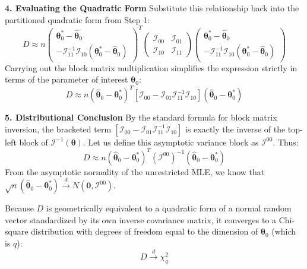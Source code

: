 \documentclass[
  letterpaper,
  DIV=11,
  numbers=noendperiod]{scrreprt}
\renewcommand{\[}{\begin{equation}}
\renewcommand{\]}{\end{equation}}
\theoremstyle{definition}
\theoremstyle{plain}
\theoremstyle{plain}
\theoremstyle{plain}
\theoremstyle{definition}
\theoremstyle{plain}
\theoremstyle{remark}
\begin{document}
\textbf{4. Evaluating the Quadratic Form} Substitute this relationship
back into the partitioned quadratic form from Step 1:
\[D \approx n \begin{pmatrix} \boldsymbol{\theta}_0^* - \hat{\boldsymbol{\theta}}_0 \\ -\mathcal{I}_{11}^{-1} \mathcal{I}_{10} (\boldsymbol{\theta}_0^* - \hat{\boldsymbol{\theta}}_0) \end{pmatrix}^T \begin{pmatrix} \mathcal{I}_{00} & \mathcal{I}_{01} \\ \mathcal{I}_{10} & \mathcal{I}_{11} \end{pmatrix} \begin{pmatrix} \boldsymbol{\theta}_0^* - \hat{\boldsymbol{\theta}}_0 \\ -\mathcal{I}_{11}^{-1} \mathcal{I}_{10} (\boldsymbol{\theta}_0^* - \hat{\boldsymbol{\theta}}_0) \end{pmatrix}\]
Carrying out the block matrix multiplication simplifies the expression
strictly in terms of the parameter of interest
\(\boldsymbol{\theta}_0\):
\[D \approx n (\hat{\boldsymbol{\theta}}_0 - \boldsymbol{\theta}_0^*)^T \left[ \mathcal{I}_{00} - \mathcal{I}_{01} \mathcal{I}_{11}^{-1} \mathcal{I}_{10} \right] (\hat{\boldsymbol{\theta}}_0 - \boldsymbol{\theta}_0^*)\]

\textbf{5. Distributional Conclusion} By the standard formula for block
matrix inversion, the bracketed term
\([ \mathcal{I}_{00} - \mathcal{I}_{01} \mathcal{I}_{11}^{-1} \mathcal{I}_{10} ]\)
is exactly the inverse of the top-left block of
\(\mathcal{I}^{-1}(\boldsymbol{\theta})\). Let us define this asymptotic
variance block as \(\mathcal{I}^{00}\). Thus:
\[D \approx n (\hat{\boldsymbol{\theta}}_0 - \boldsymbol{\theta}_0^*)^T (\mathcal{I}^{00})^{-1} (\hat{\boldsymbol{\theta}}_0 - \boldsymbol{\theta}_0^*)\]
From the asymptotic normality of the unrestricted MLE, we know that
\(\sqrt{n}(\hat{\boldsymbol{\theta}}_0 - \boldsymbol{\theta}_0^*) \xrightarrow{d} N(\mathbf{0}, \mathcal{I}^{00})\).

Because \(D\) is geometrically equivalent to a quadratic form of a
normal random vector standardized by its own inverse covariance matrix,
it converges to a Chi-square distribution with degrees of freedom equal
to the dimension of \(\boldsymbol{\theta}_0\) (which is \(q\)):
\[D \xrightarrow{d} \chi^2_q\]
\end{document}
